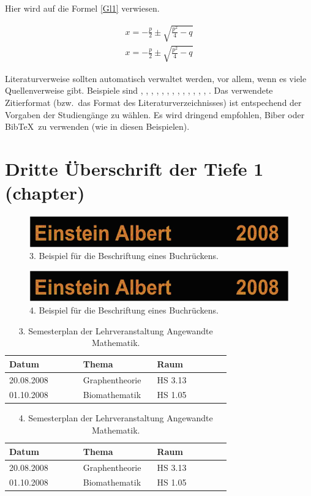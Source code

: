 \documentclass[BMR,Bachelor,english,Harvard]{twbook}%
\begin{document}
Hier wird auf die Formel \ref{Gl1} verwiesen.

\begin{align}
x = -\frac{p}{2}\pm\sqrt{\frac{p^2}{4}-q}\label{Gl1}
\end{align}
\begin{align}
x = -\frac{p}{2}\pm\sqrt{\frac{p^2}{4}-q}\label{Gl2}
\end{align}

Literaturverweise sollten automatisch verwaltet werden, vor allem, wenn es viele Quellenverweise gibt. Beispiele sind  \cite{Ko05a}, \cite{Ko05b}, \cite{MiGo05}, \cite{TeGo14}, \cite{HuHa07}, \cite{HuZi10}, \cite{ZiKu07}, \cite{He07}, \cite{SIE11}, \cite{SIE14}, \cite{ISO98}, \cite{ATM11}, \cite{Hu11}, \cite{Po10}. Das verwendete Zitierformat (bzw.~das Format des Literaturverzeichnisses) ist entspechend der Vorgaben der Studiengänge zu wählen.
Es wird dringend empfohlen, Biber oder BibTeX~zu verwenden (wie in diesen Beispielen).

\chapter{Dritte Überschrift der Tiefe 1 (chapter)}
\begin{figure}[!htbp]
\centering
\includegraphics[width=0.5\linewidth]{PICs/buchruecken}
\caption{3. Beispiel für die Beschriftung eines Buchrückens.}\label{Abb3}
\end{figure}
\begin{figure}[!htbp]
\centering
\includegraphics[width=0.5\linewidth]{PICs/buchruecken}
\caption{4. Beispiel für die Beschriftung eines Buchrückens.}\label{Abb4}
\end{figure}


\begin{table}[!htbp]
\centering
\caption{3. Semesterplan der Lehrveranstaltung \glqq Angewandte Mathematik\grqq.}\label{tab3}
\begin{tabular}{| p{0.3\linewidth} | p{0.3\linewidth} | p{0.3\linewidth} |}\hline
Datum & Thema & Raum\\\hline
20.08.2008 & Graphentheorie & HS 3.13\\
01.10.2008 & Biomathematik & HS 1.05\\\hline
\end{tabular}
\end{table}
\begin{table}[!htbp]
\centering
\caption{4. Semesterplan der Lehrveranstaltung \glqq Angewandte Mathematik\grqq.}\label{tab4}
\begin{tabular}{| p{0.3\linewidth} | p{0.3\linewidth} | p{0.3\linewidth} |}\hline
Datum & Thema & Raum\\\hline
20.08.2008 & Graphentheorie & HS 3.13\\
01.10.2008 & Biomathematik & HS 1.05\\\hline
\end{tabular}
\end{table}
\end{document}
